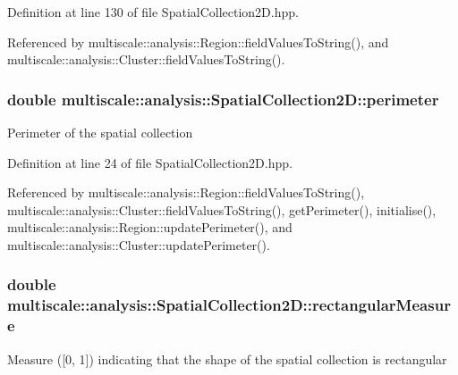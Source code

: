 Definition at line 130 of file Spatial\-Collection2\-D.\-hpp.



Referenced by multiscale\-::analysis\-::\-Region\-::field\-Values\-To\-String(), and multiscale\-::analysis\-::\-Cluster\-::field\-Values\-To\-String().

\hypertarget{classmultiscale_1_1analysis_1_1SpatialCollection2D_ae8045702b66fd813cfff49fa86b02e68}{
\subsubsection[{perimeter}]{\setlength{\rightskip}{0pt plus 5cm}double multiscale\-::analysis\-::\-Spatial\-Collection2\-D\-::perimeter\hspace{0.3cm}{\ttfamily [protected]}}}\label{classmultiscale_1_1analysis_1_1SpatialCollection2D_ae8045702b66fd813cfff49fa86b02e68}
Perimeter of the spatial collection 

Definition at line 24 of file Spatial\-Collection2\-D.\-hpp.



Referenced by multiscale\-::analysis\-::\-Region\-::field\-Values\-To\-String(), multiscale\-::analysis\-::\-Cluster\-::field\-Values\-To\-String(), get\-Perimeter(), initialise(), multiscale\-::analysis\-::\-Region\-::update\-Perimeter(), and multiscale\-::analysis\-::\-Cluster\-::update\-Perimeter().

\hypertarget{classmultiscale_1_1analysis_1_1SpatialCollection2D_aad7d79a7bd299d4d3c08a864cfcb77c3}{
\subsubsection[{rectangular\-Measure}]{\setlength{\rightskip}{0pt plus 5cm}double multiscale\-::analysis\-::\-Spatial\-Collection2\-D\-::rectangular\-Measure\hspace{0.3cm}{\ttfamily [protected]}}}\label{classmultiscale_1_1analysis_1_1SpatialCollection2D_aad7d79a7bd299d4d3c08a864cfcb77c3}
Measure (\mbox{[}0, 1\mbox{]}) indicating that the shape of the spatial collection is rectangular 

